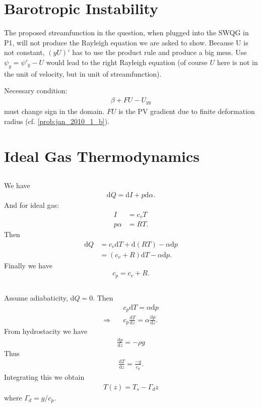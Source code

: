 \documentclass[11pt,letterpaper]{book}
\theoremstyle{definition}
\newcommand{\de}{\mathrm{d}}
\newcommand{\thus}{\Rightarrow \quad }
\begin{document}
\section{Barotropic Instability}
The proposed streamfunction in the question, when plugged into the SWQG in P1, will not produce the Rayleigh equation we are asked to show. Because U is not constant, $(yU)'$ has to use the product rule and produce a big mess. Use $\psi_y = \psi'_y-U$ would lead to the right Rayleigh equation (of course $U$ here is not in the unit of velocity, but in unit of streamfunction).

Necessary condition:
\begin{align*}
\beta+FU-U_{yy}
\end{align*}
must change sign in the domain. $FU$ is the PV gradient due to finite deformation radius (cf. \ref{prob:jan_2010_1_b}). 

\section{Ideal Gas Thermodynamics}\label{Jan_2010_Prob3}
\subsection{}
We have
\begin{align*}
\de Q = \de I+p\de \alpha.
\end{align*}
And for ideal gas: 
\begin{align*}
I &= c_v T\\
p\alpha &= RT.
\end{align*}
Then
\begin{align*}
\de Q &= c_v\de T+ \de(RT)-\alpha\de p\\
&= (c_v+R)\de T-\alpha\de p.
\end{align*}
Finally we have
$$c_p = c_v+R.$$

\subsection{}\label{jan_2010_3_2}
Assume adiabaticity, $\de Q = 0$. Then
\begin{align*}
&c_p\de T = \alpha\de p\\
\thus &c_p\frac{\de T}{\de z} = \alpha\frac{\de p}{\de z}.
\end{align*}
From hydrostacity we have
\begin{align*}
\frac{\de p}{\de z} = -\rho g
\end{align*}
Thus
\begin{align*}
\frac{\de T}{\de z} = \frac{-g}{c_p}.
\end{align*}
Integrating this we obtain
\begin{align*}
T(z) = T_s-\Gamma_dz
\end{align*}
where $\Gamma_d = g/c_p$.
\end{document}

